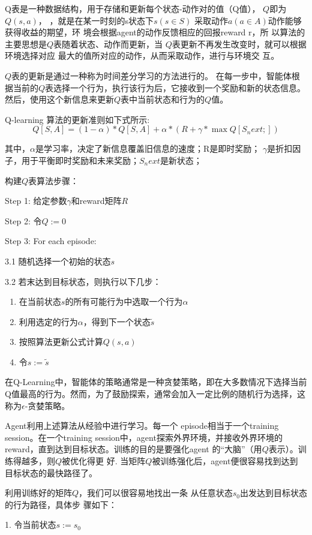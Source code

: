 \documentclass{thuemp}
\begin{document}
Q表是一种数据结构，用于存储和更新每个状态-动作对的值（Q值），
$Q$即为$Q(s, a)$， ，就是在某一时刻的s状态下$s(s\in S)$
采取动作$a(a\in A)$动作能够获得收益的期望，环
境会根据agent的动作反馈相应的回报reward r，所
以算法的主要思想是$Q$表随着状态、动作而更新，当
$Q$表更新不再发生改变时，就可以根据环境选择对应
最大的值所对应的动作，从而采取动作，进行与环境交
互。

$Q$表的更新是通过一种称为时间差分学习的方法进行的。
在每一步中，智能体根据当前的$Q$表选择一个行为，执行该行为后，它接收到一个奖励和新的状态信息。
然后，使用这个新信息来更新$Q$表中当前状态和行为的$Q$值。

Q-learning 算法的更新准则如下式所示:
$$Q[S,A]=(1-\alpha)*Q[S,A]+\alpha*(R+\gamma*\max Q[S_next;])$$

其中，$\alpha$是学习率，决定了新信息覆盖旧信息的速度；R是即时奖励；
$\gamma$是折扣因子，用于平衡即时奖励和未来奖励；$S_next$是新状态；

构建$Q$表算法步骤：

Step 1: 给定参数$\gamma$和reward矩阵$R$

Step 2: 令$Q:=0$

Step 3: For each episode:

3.1 随机选择一个初始的状态$s$

3.2 若末达到目标状态，则执行以下几步：
\begin{enumerate}
  \item 在当前状态$s$的所有可能行为中选取一个行为$\alpha$
  \item 利用选定的行为$\alpha$，得到下一个状态$\tilde{s}$
  \item 按照算法更新公式计算$Q(s, a)$
  \item 令$s:=\widetilde{s}$
\end{enumerate}

在Q-Learning中，智能体的策略通常是一种贪婪策略，即在大多数情况下选择当前Q值最高的行为。然而，为了鼓励探索，通常会加入一定比例的随机行为选择，这称为$\epsilon$-贪婪策略。

Agent利用上述算法从经验中进行学习。每一个
episode相当于一个training session。在一个training session中，agent探索外界环境，并接收外界环境的
reward，直到达到目标状态。训练的目的是要强化agent
的“大脑”（用$Q$表示）。训练得越多，则$Q$被优化得更
好. 当矩阵$Q$被训练强化后，agent便很容易找到达到
目标状态的最快路径了。

利用训练好的矩阵$Q$，我们可以很容易地找出一条
从任意状态$s_0$出发达到目标状态的行为路径，具体步
骤如下：

1. 令当前状态$s := s_0$
\end{document}
